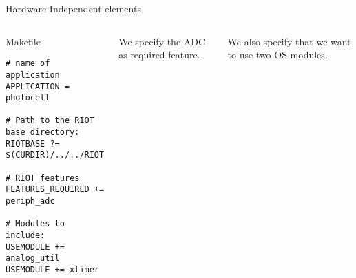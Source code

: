 \documentclass[aspectratio=169]{beamer}
\begin{document}
\begin{frame}[fragile]{Hardware Independent elements}
\begin{columns}

\begin{exampleblock}{Makefile}
\begin{verbatim}
# name of application
APPLICATION = photocell

# Path to the RIOT base directory:
RIOTBASE ?= $(CURDIR)/../../RIOT

# RIOT features
FEATURES_REQUIRED += periph_adc

# Modules to include:
USEMODULE += analog_util
USEMODULE += xtimer
\end{verbatim}
\end{exampleblock}


\vspace{3.5cm}

We specify the ADC as \alert{required} feature.

\bigskip

We also specify that we want to use two \alert{OS modules}.


\end{columns}
\vspace{2cm}
\end{frame}
\end{document}
